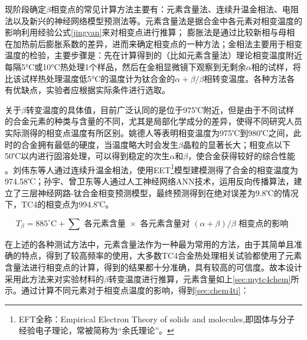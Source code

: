 现阶段确定$ \beta $相变点的常见计算方法\cite{zhuhongTaihejinaVxiangbiandiandejizhongceshifangfatantao2013}主要有：元素含量法、连续升温金相法、电阻法以及新兴的神经网络模型预测法\cite{renchiqiangGurongshixiaoduiTC4taihejinxianweizuzhihelixuexingnengdeyingxiang2022}等。元素含量法是据合金中各元素对相变温度的影响\cite{ananyaLocationBasedIntelligent2011}利用经验公式\ref{jingyan}来对相变点进行推算；%
膨胀法是通过比较新相与母相在加热前后膨胀系数的差异，进而来确定相变点的一种方法；金相法主要用于相变温度的检验，主要步骤是：先在计算得到的（比如元素含量法）理论相变温度附近每隔5°C或10°C热处理1个样品，然后在金相显微镜下观察到无剩余$\alpha$相的试样，将比该试样热处理温度低5°C的温度计为钛合金的$\alpha+\beta/\beta$相转变温度。各种方法各有优缺点，实验者应根据实际条件进行选取。

关于$\beta$转变温度的具体值，目前广泛认同的是位于975℃附近，但是由于不同试样的合金元素的种类与含量的不同，尤其是局部化学成分的差异，使得不同研究人员实际测得的相变点温度有所区别\cite{wangtaoTC4hejinxiangbianwendujiancezhongjieguobuyizhiyuanyinfenxi2013}。姚德人等\cite{yaoderenTc4taihejinxiangbiandiandeceding1975}表明相变温度为975℃到980℃之间，此时的合金拥有最低的硬度，当温度略大时会发生$\beta$晶粒的显著长大；相变点以下50℃以内进行固溶处理，可以得到稳定的次生$ \alpha$和$ \beta $，使合金获得较好的综合性能%
。刘伟东等人\cite{liuweidongTC4hejinVzhuanbianwendudejinxiangfacedingyulilunjisuan2014}通过连续升温金相法，使用EET\footnote{EFT全称：Empirical Electron Theory of solids and molecules,即固体与分子经验电子理论，常被简称为“余氏理论”。}模型建模测得了\ti 合金的相变温度为974.58℃；孙宇、曾卫东等人\cite{sunyuYingyongrengongshenjingwangluoyanjiuhuaxueyuansuduitaihejinxiangbiandiandeyingxiang2010}通过人工神经网络ANN技术，运用反向传播算法，建立了三层神经网路-钛合金相变预测模型，最终预测得到在绝对误差为9.8℃的情况下，TC4的相变点为994.8℃。

\begin{equation}
	T_\beta=885^{\circ} \mathrm{C}+\sum \textit{ 各元素含量 } \times \textit{ 各元素含量对 }(\alpha+\beta) / \beta \textit{ 相变点的影响 }
	\label{jingyan}
\end{equation}

在上述的各种测试方法中，元素含量法作为一种最为常用的方法，由于其简单且准确的特点，得到了较高频率的使用，大多数TC4合金热处理相关试验都使用了元素含量法进行相变点的计算\cite{LiuLeiTi6Al4VTaiHeJinBuTongReChuLiFangFaDeShiYanYuFuHeCaiLiaoLiXueXingNengFenXi2022,zouhaibeiTC4taihejinrechuliqianghuagongyijixiangbianhangweiyanjiu2019,liutaoRechuliduiTC4taihejindongtailixuexingnengheweiguanzuzhideyingxiang,baoxuechunRechuligongyiduiTC4taihejinzuzhihelixuexingnengdeyingxiang2019,wangpuqiangButongrechuligongyixiajiguangzengcaizhizaoTC4taihejinzuzhiyuxingnengyanjiujinzhan2020}，得到的结果都十分准确，具有较高的可信度。故本设计采用此方法来对实验材料的$\beta$转变温度进行推算，元素含量如上\ref{sec:mytc4chem}所示。通过计算不同元素对于相变点温度的影响，得到\ref{sec:chem4ti}：

